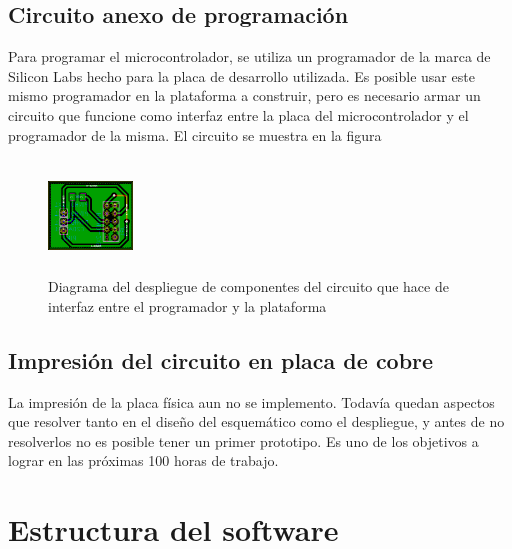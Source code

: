 \documentclass{article}
\theoremstyle{definition}
\theoremstyle{remark}
\begin{document}

\subsection{Circuito anexo de programación} %
\label{sub:circuito_anexo_de_programacion}

Para programar el microcontrolador, se utiliza un programador de la marca de Silicon Labs hecho para la placa de desarrollo utilizada. Es posible usar este mismo programador en la plataforma a construir, pero es necesario armar un circuito que funcione como interfaz entre la placa del microcontrolador y el programador de la misma. El circuito se muestra en la figura

\begin{figure}[H]
  \centering
  \includegraphics[width=0.20\textwidth, height = 3cm]{PCB2}
  \caption{\small Diagrama del despliegue de componentes del circuito que hace de interfaz entre el programador y la plataforma}\label{fig:PCB2}
\end{figure}


\subsection{Impresión del circuito en placa de cobre} %
\label{sub:impresion_del_circuito_en_placa_de_cobre}

La impresión de la placa física aun no se implemento. Todavía quedan aspectos que resolver tanto en el diseño del esquemático como el despliegue, y antes de no resolverlos no es posible tener un primer prototipo. Es uno de los objetivos a lograr en las próximas 100 horas de trabajo.





\section{Estructura del software} %
\label{sec:estructura_del_software}
\end{document}
